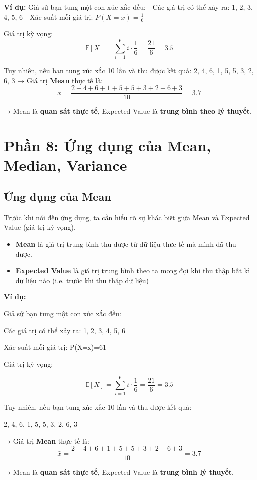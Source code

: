 \documentclass[11pt]{article}
\begin{document}
\textbf{Ví dụ:}  
Giả sử bạn tung một con xúc xắc đều:  
- Các giá trị có thể xảy ra: 1, 2, 3, 4, 5, 6  
- Xác suất mỗi giá trị: $P(X = x) = \frac{1}{6}$  

Giá trị kỳ vọng:  
\[
\mathbb{E}[X] = \sum_{i=1}^6 i \cdot \frac{1}{6} = \frac{21}{6} = 3.5
\]

Tuy nhiên, nếu bạn tung xúc xắc 10 lần và thu được kết quả:  
2, 4, 6, 1, 5, 5, 3, 2, 6, 3  
→ Giá trị \textbf{Mean} thực tế là:
\[
\bar{x} = \frac{2 + 4 + 6 + 1 + 5 + 5 + 3 + 2 + 6 + 3}{10} = 3.7
\]

→ Mean là \textbf{quan sát thực tế}, Expected Value là \textbf{trung bình theo lý thuyết}.

\section{Phần 8: Ứng dụng của Mean, Median, Variance}

\subsection{Ứng dụng của Mean}

Trước khi nói đến ứng dụng, ta cần hiểu rõ sự khác biệt giữa Mean và Expected Value (giá trị kỳ vọng).

\begin{itemize}
\item \textbf{Mean} là giá trị trung bình thu được từ dữ liệu thực tế mà mình đã thu được.
\item \textbf{Expected Value} là giá trị trung bình theo ta mong đợi khi thu thập bất kì dữ liệu nào (i.e. trước khi thu thập dữ liệu)
\end{itemize}

\textbf{Ví dụ:}

Giả sử bạn tung một con xúc xắc đều:

    Các giá trị có thể xảy ra: 1, 2, 3, 4, 5, 6

    Xác suất mỗi giá trị: P(X=x)=61​

Giá trị kỳ vọng:

\[
\mathbb{E}[X] = \sum_{i=1}^6 i \cdot \frac{1}{6} = \frac{21}{6} = 3.5
\]

Tuy nhiên, nếu bạn tung xúc xắc 10 lần và thu được kết quả:

2, 4, 6, 1, 5, 5, 3, 2, 6, 3

→ Giá trị \textbf{Mean} thực tế là:
\[
\bar{x} = \frac{2 + 4 + 6 + 1 + 5 + 5 + 3 + 2 + 6 + 3}{10} = 3.7
\]

→ Mean là \textbf{quan sát thực tế}, Expected Value là \textbf{trung bình lý thuyết}.
\end{document}
